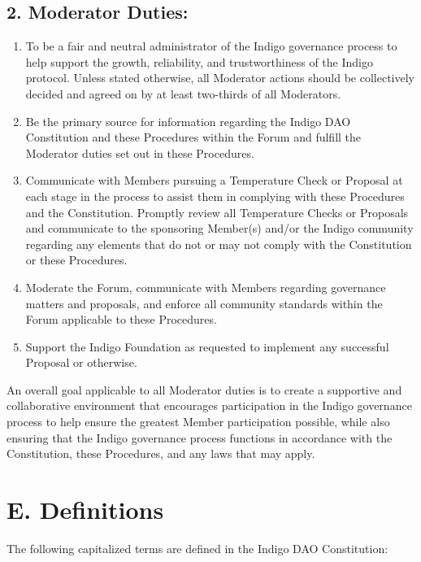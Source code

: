 \hypertarget{moderator-duties}{%
\subsection{2. Moderator Duties:}\label{moderator-duties}}

\begin{enumerate}
\item
  To be a fair and neutral administrator of the Indigo governance
  process to help support the growth, reliability, and trustworthiness
  of the Indigo protocol. Unless stated otherwise, all Moderator actions
  should be collectively decided and agreed on by at least two-thirds of
  all Moderators.
\item
  Be the primary source for information regarding the Indigo DAO
  Constitution and these Procedures within the Forum and fulfill the
  Moderator duties set out in these Procedures.
\item
  Communicate with Members pursuing a Temperature Check or Proposal at
  each stage in the process to assist them in complying with these
  Procedures and the Constitution. Promptly review all Temperature
  Checks or Proposals and communicate to the sponsoring Member(s) and/or
  the Indigo community regarding any elements that do not or may not
  comply with the Constitution or these Procedures.
\item
  Moderate the Forum, communicate with Members regarding governance
  matters and proposals, and enforce all community standards within the
  Forum applicable to these Procedures.
\item
  Support the Indigo Foundation as requested to implement any successful
  Proposal or otherwise.
\end{enumerate}

An overall goal applicable to all Moderator duties is to create a
supportive and collaborative environment that encourages participation
in the Indigo governance process to help ensure the greatest Member
participation possible, while also ensuring that the Indigo governance
process functions in accordance with the Constitution, these Procedures,
and any laws that may apply.

\hypertarget{e.-definitions}{%
\section{E. Definitions}\label{e.-definitions}}

The following capitalized terms are defined in the Indigo DAO
Constitution:

